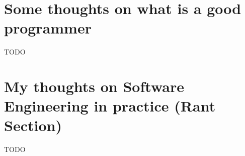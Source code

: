 \documentclass[11pt,a4paper,sans]{moderncv}
\begin{document}
\section{Some thoughts on what is a good programmer}
TODO


\section{My thoughts on Software Engineering in practice (Rant Section)}
TODO


\end{document}
